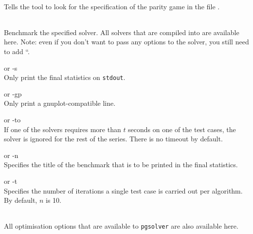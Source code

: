 \begin{description}
\itemsep3mm
\item[\nonterminal{filename}] \ \\
   Tells the tool to look for the specification of the parity game in the file
   .

\item[{\ttfamily --\nonterminal{solver} `solver options`}] \ \\
   Benchmark the specified solver. All solvers that are compiled into \pgsolver are available here. Note: even if you don't want to pass any options to the solver, you still need to add ``.

\item[{\ttfamily --silent}] \enspace or {\ttfamily -s} \\
   Only print the final statistics on \texttt{stdout}.

\item[{\ttfamily --gnuplotformat}] \enspace or {\ttfamily -gp} \\
   Only print a gnuplot-compatible line.

 \item[{\ttfamily --timeout \nonterminal{timeout}}] \enspace or {\ttfamily -to } \\
   If one of the solvers requires more than $t$ seconds on one of the test cases, the solver is ignored
   for the rest of the series. There is no timeout by default.

\item[{\ttfamily --name \nonterminal{title}}] \enspace or {\ttfamily -n } \\
   Specifies the title of the benchmark that is to be printed in the final statistics.

 \item[{\ttfamily --times \nonterminal{n}}] \enspace or {\ttfamily -t } \\
   Specifies the number of iterations a single test case is carried out per algorithm. By default, $n$
   is 10.

\item[{\ttfamily --\nonterminal{optimisation-option}}] \ \\
   All optimisation options that are available to \texttt{pgsolver} are also available here.
\end{description}



